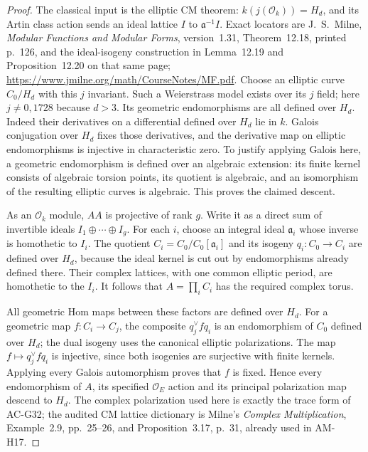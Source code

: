 \begin{proof}
The classical input is the elliptic CM theorem:
$k(j(\mathcal O_k))=H_d$, and its Artin class action sends an
ideal lattice $I$ to $\mathfrak a^{-1}I$.
Exact locators are J.~S.~Milne,
\emph{Modular Functions and Modular Forms}, version~1.31,
Theorem~12.18, printed p.~126, and the ideal-isogeny
construction in Lemma~12.19 and Proposition~12.20 on that
same page; \url{https://www.jmilne.org/math/CourseNotes/MF.pdf}.
Choose an elliptic curve $C_0/H_d$ with this $j$ invariant.
Such a Weierstrass model exists over its $j$ field;
here $j\ne0,1728$ because $d>3$.
Its geometric endomorphisms are all defined over $H_d$.
Indeed their derivatives on a differential defined over $H_d$
lie in $k$.  Galois conjugation over $H_d$ fixes those derivatives,
and the derivative map on elliptic endomorphisms is injective
in characteristic zero.  To justify applying Galois here,
a geometric endomorphism is defined over an algebraic extension:
its finite kernel consists of algebraic torsion points, its
quotient is algebraic, and an isomorphism of the resulting
elliptic curves is algebraic.  This proves the claimed descent.

As an $\mathcal O_k$ module, $AA$ is projective of rank $g$.
Write it as a direct sum of invertible ideals
$I_1\oplus\cdots\oplus I_g$.
For each $i$, choose an integral ideal $\mathfrak a_i$ whose
inverse is homothetic to $I_i$.
The quotient
$C_i=C_0/C_0[\mathfrak a_i]$ and its isogeny
$q_i:C_0\to C_i$ are defined over $H_d$, because the ideal
kernel is cut out by endomorphisms already defined there.
Their complex lattices, with one common elliptic period,
are homothetic to the $I_i$.  It follows that
$A=\prod_i C_i$ has the required complex torus.

All geometric Hom maps between these factors are defined
over $H_d$.  For a geometric map $f:C_i\to C_j$, the composite
$q_j^\vee f q_i$ is an endomorphism of $C_0$ defined over $H_d$;
the dual isogeny uses the canonical elliptic polarizations.
The map $f\mapsto q_j^\vee f q_i$ is injective, since both
isogenies are surjective with finite kernels.
Applying every Galois automorphism proves that $f$ is fixed.
Hence every endomorphism of $A$, its specified $\mathcal O_E$
action and its principal polarization map descend to $H_d$.
The complex polarization used here is exactly the trace form
of AC-G32; the audited CM lattice dictionary is Milne's
\emph{Complex Multiplication}, Example~2.9, pp.~25--26,
and Proposition~3.17, p.~31, already used in AM-H17.


\end{proof}
